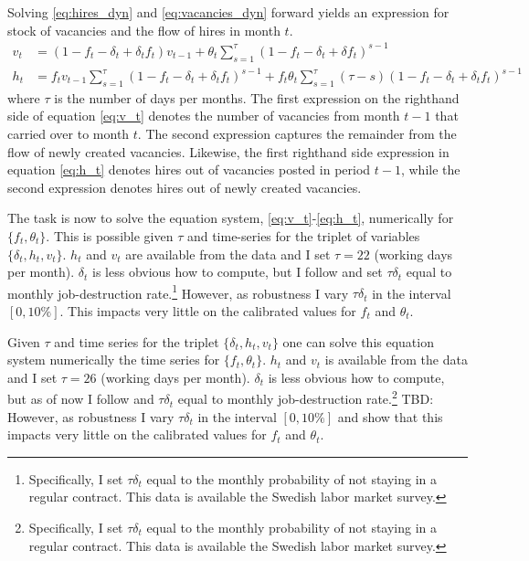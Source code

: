 Solving \eqref{eq:hires_dyn} and \eqref{eq:vacancies_dyn} forward yields an expression for stock of vacancies and the flow of hires in month $t$.
\begin{align}
v_t&=\left( 1-f_t-\delta_t+\delta_t f_t \right) v_{t-1} + \theta_t \sum_{s=1}^{\tau} \left( 1-f_t-\delta_t+\delta f_t \right)^{s-1}  \label{eq:v_t} \\
h_t&=f_t v_{t-1} \sum_{s=1}^{\tau} \left( 1-f_t-\delta_t+\delta_t f_t \right)^{s-1} + f_t \theta_t \sum_{s=1}^{\tau} \left( \tau- s\right) \left( 1-f_t-\delta_t+\delta_t f_t \right)^{s-1} \label{eq:h_t}
\end{align}
where $\tau$ is the number of days per months. The first expression on the righthand side of equation \eqref{eq:v_t} denotes the number of vacancies from month $t-1$ that carried over to month $t$. The second expression captures the remainder from the flow of newly created vacancies. Likewise, the first righthand side expression in equation \eqref{eq:h_t} denotes hires out of vacancies posted in period $t-1$, while the second expression denotes hires out of newly created vacancies. 

The task is now to solve the equation system, \eqref{eq:v_t}-\eqref{eq:h_t}, numerically for $\{ f_t, \theta_t \}$. This is possible given $\tau$ and time-series for the triplet of variables $\{\delta_t, h_t, v_t \}$. $h_t$ and $v_t$ are available from the data and I set $\tau=22$ (working days per month). $\delta_t$ is less obvious how to compute, but  I follow \cite{Davis2013} and set $\tau \delta_t$ equal to monthly job-destruction rate.\footnote{Specifically, I set $\tau \delta_t$ equal to the monthly probability of not staying in a regular contract. This data is available the Swedish labor market survey.} However, as robustness I vary $\tau \delta_t$ in the interval $[0,10\%]$. This impacts very little on the calibrated values for $f_t$ and $\theta_t$.

Given $\tau$ and time series for the triplet $\{\delta_t, h_t, v_t \}$ one can solve this equation system numerically the time series for $\{ f_t, \theta_t \}$. $h_t$ and $v_t$ is available from the data and I set $\tau=26$ (working days per month). $\delta_t$ is less obvious how to compute, but as of now I follow \cite{Davis2013} and $\tau \delta_t$ equal to monthly job-destruction rate.\footnote{Specifically, I set $\tau \delta_t$ equal to the monthly probability of not staying in a regular contract. This data is available the Swedish labor market survey.} TBD: However, as robustness I vary $\tau \delta_t$ in the interval $[0,10\%]$ and show that this impacts very little on the calibrated values for $f_t$ and $\theta_t$.

